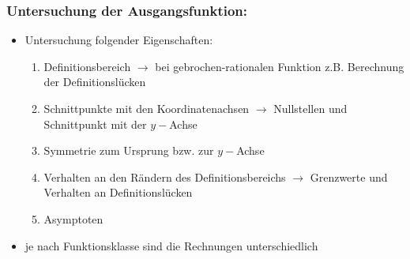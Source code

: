 \documentclass[a4paper,twocolumn,10pt]{onepgnote}
\begin{document}
 \subsubsection{Untersuchung der Ausgangsfunktion:}
 \begin{itemize}
     \item Untersuchung folgender Eigenschaften:\\
     \begin{enumerate}
         \item Definitionsbereich $\longrightarrow$ bei gebrochen-rationalen Funktion z.B. Berechnung der Definitionslücken\\
         \item Schnittpunkte mit den Koordinatenachsen $\longrightarrow$ Nullstellen und Schnittpunkt mit der $y-$Achse\\
         \item Symmetrie zum Ursprung bzw. zur $y-$Achse\\
         \item Verhalten an den Rändern des Definitionsbereichs $\longrightarrow$ Grenzwerte und Verhalten an Definitionslücken\\
         \item Asymptoten
     \end{enumerate}
     \item je nach Funktionsklasse sind die Rechnungen unterschiedlich
 \end{itemize}
\end{document}
